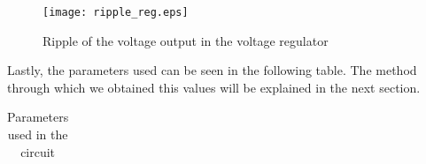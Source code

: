 \begin{figure}[H] \centering
\texttt{[image: ripple\_reg.eps]}
\caption{Ripple of the voltage output in the voltage regulator}
\end{figure}


\par Lastly, the parameters used can be seen in the following table. The method through which we obtained this values will be explained in the next section.

\vspace{5mm}
\begin{table}[H]
\centering
\begin{tabularx}{0.9\textwidth} {
  | >{\raggedright\arraybackslash}X
  | >{\raggedleft\arraybackslash}X | }
 \hline

\end{tabularx}
\caption{\label{tab:Table 3} Parameters used in the circuit}
\end{table}
\vspace{5mm}
	


